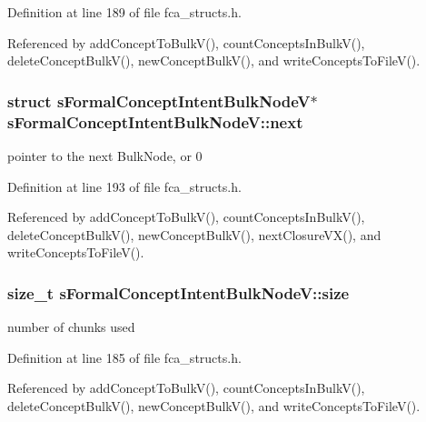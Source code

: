 \-Definition at line 189 of file fca\-\_\-structs.\-h.



\-Referenced by add\-Concept\-To\-Bulk\-V(), count\-Concepts\-In\-Bulk\-V(), delete\-Concept\-Bulk\-V(), new\-Concept\-Bulk\-V(), and write\-Concepts\-To\-File\-V().

\hypertarget{structsFormalConceptIntentBulkNodeV_ac2cd46a8c3334e2d2fdbc6c203707ed8}{
\subsubsection[{next}]{\setlength{\rightskip}{0pt plus 5cm}struct {\bf s\-Formal\-Concept\-Intent\-Bulk\-Node\-V}$\ast$ {\bf s\-Formal\-Concept\-Intent\-Bulk\-Node\-V\-::next}}}\label{structsFormalConceptIntentBulkNodeV_ac2cd46a8c3334e2d2fdbc6c203707ed8}


pointer to the next \-Bulk\-Node, or 0 



\-Definition at line 193 of file fca\-\_\-structs.\-h.



\-Referenced by add\-Concept\-To\-Bulk\-V(), count\-Concepts\-In\-Bulk\-V(), delete\-Concept\-Bulk\-V(), new\-Concept\-Bulk\-V(), next\-Closure\-V\-X(), and write\-Concepts\-To\-File\-V().

\hypertarget{structsFormalConceptIntentBulkNodeV_a516403c9da58b5bedbf72f0a037d5c4f}{
\subsubsection[{size}]{\setlength{\rightskip}{0pt plus 5cm}size\-\_\-t {\bf s\-Formal\-Concept\-Intent\-Bulk\-Node\-V\-::size}}}\label{structsFormalConceptIntentBulkNodeV_a516403c9da58b5bedbf72f0a037d5c4f}


number of chunks used 



\-Definition at line 185 of file fca\-\_\-structs.\-h.



\-Referenced by add\-Concept\-To\-Bulk\-V(), count\-Concepts\-In\-Bulk\-V(), delete\-Concept\-Bulk\-V(), new\-Concept\-Bulk\-V(), and write\-Concepts\-To\-File\-V().

